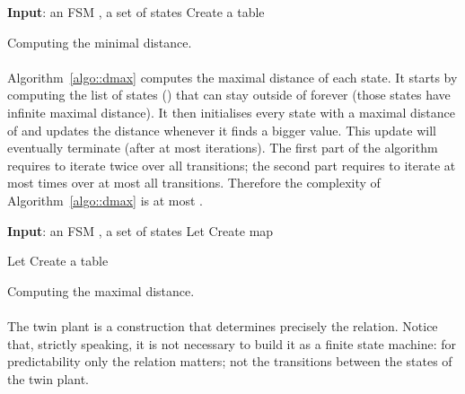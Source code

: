 \documentclass{article}
\begin{document}
\begin{algorithm}[ht]
  \begin{algorithmic}
  \STATE 
    {\bf Input}: an FSM , 
    a set of states 
  \STATE 
    Create a table 
  \FORALL{}
    \STATE 
  \ENDFOR
  \STATE 
    
  \FORALL{}
    \STATE 
    \STATE 
  \ENDFOR
  \WHILE{} 
    \STATE 
    \FORALL{}
      \IF{}
        \STATE 
        \STATE 
      \ENDIF
    \ENDFOR
  \ENDWHILE
  \end{algorithmic}
  \caption{Computing the minimal distance.}
  \label{algo::dmin}
\end{algorithm}

\paragraph{}
Algorithm~\ref{algo::dmax} computes the maximal distance of each state.  
It starts by computing the list of states () 
that can stay outside of  forever 
(those states have infinite maximal distance).  
It then initialises every state with a maximal distance of  
and updates the distance whenever it finds a bigger value.  
This update will eventually terminate 
(after at most  iterations).  
The first part of the algorithm requires to iterate twice
over all transitions; 
the second part requires to iterate at most  times 
over at most all transitions.  
Therefore the complexity of Algorithm~\ref{algo::dmax} 
is at most .  

\begin{algorithm}[p]
\begin{algorithmic}
\STATE 
  {\bf Input}: an FSM , 
  a set of states 
\STATE 
  Let 
\STATE 
  Create map 
\STATE
  
\FORALL{}
  \STATE  
  \IF{}
    \STATE 
  \ENDIF
\ENDFOR
\WHILE{}
  \STATE 
    Let 
  \FORALL{}
    \STATE 
    \IF{}
      \STATE 
    \ENDIF
  \ENDFOR 
\ENDWHILE
\STATE 
  Create a table 
\FORALL{}
  \IF{} 
    \STATE 
  \ELSE
    \STATE 
  \ENDIF
\ENDFOR
\STATE 
  
\WHILE{}
  \STATE 
  \FORALL{}
    \FORALL{}
      \IF{}
        \STATE 
        \STATE  
      \ENDIF
    \ENDFOR
  \ENDFOR
\ENDWHILE
{}  
\end{algorithmic}
  \caption{Computing the maximal distance.}
  \label{algo::dmax}
\end{algorithm}

\paragraph{}
The twin plant \cite{jiang-etal::tac::01} is a construction 
that determines precisely the  relation.  
Notice that, strictly speaking, it is not necessary 
to build it as a finite state machine: 
for predictability only the  relation matters; 
not the transitions between the states of the twin plant.  
\end{document}
